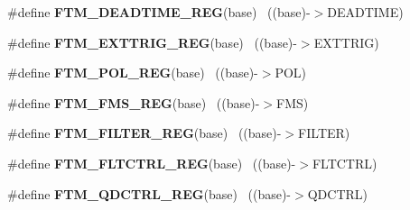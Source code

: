\begin{DoxyCompactItemize}
\item 
\hypertarget{group___f_t_m___register___accessor___macros_gafd613d2abdcb75b0dd32d3b045ee2192}{}\#define {\bfseries F\+T\+M\+\_\+\+D\+E\+A\+D\+T\+I\+M\+E\+\_\+\+R\+E\+G}(base)                                  ~((base)-\/$>$D\+E\+A\+D\+T\+I\+M\+E)\label{group___f_t_m___register___accessor___macros_gafd613d2abdcb75b0dd32d3b045ee2192}

\item 
\hypertarget{group___f_t_m___register___accessor___macros_ga471f91fbb0abe03bbbe568d75c5baa3b}{}\#define {\bfseries F\+T\+M\+\_\+\+E\+X\+T\+T\+R\+I\+G\+\_\+\+R\+E\+G}(base)                                    ~((base)-\/$>$E\+X\+T\+T\+R\+I\+G)\label{group___f_t_m___register___accessor___macros_ga471f91fbb0abe03bbbe568d75c5baa3b}

\item 
\hypertarget{group___f_t_m___register___accessor___macros_ga8e78f5088a2e01b6857336a7290f20f0}{}\#define {\bfseries F\+T\+M\+\_\+\+P\+O\+L\+\_\+\+R\+E\+G}(base)                                            ~((base)-\/$>$P\+O\+L)\label{group___f_t_m___register___accessor___macros_ga8e78f5088a2e01b6857336a7290f20f0}

\item 
\hypertarget{group___f_t_m___register___accessor___macros_ga2c28b40a38a76a870130b9cfda02ae6a}{}\#define {\bfseries F\+T\+M\+\_\+\+F\+M\+S\+\_\+\+R\+E\+G}(base)                                            ~((base)-\/$>$F\+M\+S)\label{group___f_t_m___register___accessor___macros_ga2c28b40a38a76a870130b9cfda02ae6a}

\item 
\hypertarget{group___f_t_m___register___accessor___macros_gae52e1c95a74f5562b3d840a82762fcfc}{}\#define {\bfseries F\+T\+M\+\_\+\+F\+I\+L\+T\+E\+R\+\_\+\+R\+E\+G}(base)                                      ~((base)-\/$>$F\+I\+L\+T\+E\+R)\label{group___f_t_m___register___accessor___macros_gae52e1c95a74f5562b3d840a82762fcfc}

\item 
\hypertarget{group___f_t_m___register___accessor___macros_gab0a641159aeae9d56cb5b5353f3a68ec}{}\#define {\bfseries F\+T\+M\+\_\+\+F\+L\+T\+C\+T\+R\+L\+\_\+\+R\+E\+G}(base)                                    ~((base)-\/$>$F\+L\+T\+C\+T\+R\+L)\label{group___f_t_m___register___accessor___macros_gab0a641159aeae9d56cb5b5353f3a68ec}

\item 
\hypertarget{group___f_t_m___register___accessor___macros_ga998d62e98f702aca0c1f71e7699d5973}{}\#define {\bfseries F\+T\+M\+\_\+\+Q\+D\+C\+T\+R\+L\+\_\+\+R\+E\+G}(base)                                      ~((base)-\/$>$Q\+D\+C\+T\+R\+L)\label{group___f_t_m___register___accessor___macros_ga998d62e98f702aca0c1f71e7699d5973}


\end{DoxyCompactItemize}
